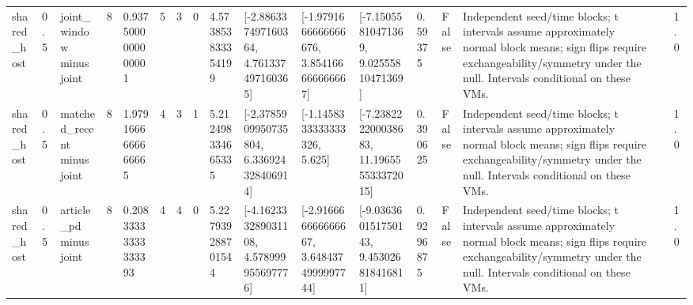 \begin{tabular}{lllllllllllllllll}
shared\_host & 0.5 & joint\_window minus joint & 8 & 0.9375000000000001 & 5 & 3 & 0 & 4.573853833354199 & [-2.886337497160364, 4.761337497160365] & [-1.9791666666666676, 3.854166666666667] & [-7.15055810471369, 9.02555810471369] & 0.59375 & False & Independent seed/time blocks; t intervals assume approximately normal block means; sign flips require exchangeability/symmetry under the null. Intervals conditional on these VMs. &  & 1.0 \\
shared\_host & 0.5 & matched\_recent minus joint & 8 & 1.9791666666666665 & 4 & 3 & 1 & 5.212498334665335 & [-2.3785909950735804, 6.336924328406914] & [-1.1458333333333326, 5.625] & [-7.238222200038683, 11.196555533372015] & 0.390625 & False & Independent seed/time blocks; t intervals assume approximately normal block means; sign flips require exchangeability/symmetry under the null. Intervals conditional on these VMs. &  & 1.0 \\
shared\_host & 0.5 & article\_pd minus joint & 8 & 0.20833333333333393 & 4 & 4 & 0 & 5.227939288701544 & [-4.162333289031108, 4.578999955697776] & [-2.916666666666667, 3.6484374999997744] & [-9.036360151750143, 9.453026818416811] & 0.9296875 & False & Independent seed/time blocks; t intervals assume approximately normal block means; sign flips require exchangeability/symmetry under the null. Intervals conditional on these VMs. &  & 1.0 \\
\end{tabular}
